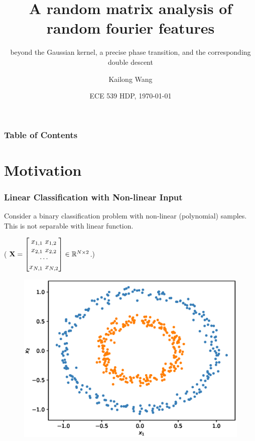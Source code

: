 \documentclass[10pt]{../formats/RU}
\title[Random Fourier Feature]{A random matrix analysis of random fourier features}
\subtitle{beyond the Gaussian kernel, a precise phase transition, and the corresponding double descent}
\author[Kai] %
{Kailong Wang\inst{1} 
}
\institute[Rutgers] %
{
  \inst{1}%
  Ph.D.\ of ECE\\
  Rutgers University
}
\date[\today] %
{ECE 539 HDP, \today}
\begin{document}
\frame{\titlepage}
\begin{frame}
\frametitle{Table of Contents}
\tableofcontents
\end{frame}


\section{Motivation}
\begin{frame}
  \frametitle{Linear Classification with Non-linear Input}
  Consider a binary classification problem with non-linear (\eg polynomial) samples. This is not separable with linear function. 

  (\eg %
  $\mathbf{X} = {
    \begin{bmatrix}
      x_{1,1} \ x_{1,2} \\
      x_{2,1} \ x_{2,2} \\
      \cdots \\
      x_{N,1} \ x_{N,2}
    \end{bmatrix}
  }\in \mathbb{R}^{N\times 2}$.)
  \begin{figure}
    \includegraphics[height=0.5\textheight]{./figs/2d_poly_circle.eps}%
  \end{figure}
\end{frame}
\end{document}
